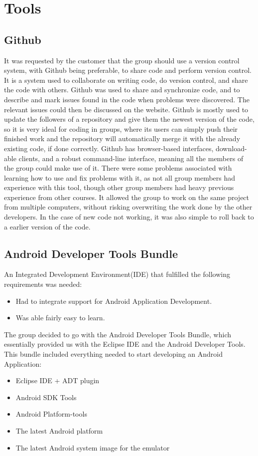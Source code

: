 \chapter{Tools}

\section{Github} 
\label{def:github}
\label{def:githubDev}
It was requested by the customer that the group should use a version control system, with Github being preferable, to share code and perform version control. It is a system used to collaborate on writing code, do version control, and share the code with others.  Github was used to share and synchronize code, and to describe and mark issues found in the code when problems were discovered. The relevant issues could then be discussed on the website.  Github is mostly used to update the followers of a repository and give them the newest version of the code, so it is  very ideal for coding in groups, where its users can simply push their finished work and the repository will automatically merge it with the already existing code, if done correctly.  Github has browser-based interfaces, download-able clients, and a robust command-line interface, meaning all the members of the group could make use of it. There were some problems associated with learning how to use and fix problems with it, as not all group members had experience with this tool, though other group members had heavy previous experience from other courses. It allowed the group to work on the same project from multiple computers, without risking overwriting the work done by the other developers. In the case of new code not working, it was also simple to roll back to a earlier version of the code. 

\section{Android Developer Tools Bundle}
An Integrated Development Environment(IDE) that fulfilled the following requirements was needed:
\begin{itemize}
\item Had to integrate support for Android Application Development.
\item Was able fairly easy to learn. 
\end{itemize}
The group decided to go with the Android Developer Tools Bundle, which essentially provided us with the Eclipse IDE and the Android Developer Tools. This bundle included everything needed to start developing an Android Application:
\begin{itemize}
\item Eclipse IDE + ADT plugin
\item Android SDK Tools
\item Android Platform-tools
\item The latest Android platform
\item The latest Android system image for the emulator
\end{itemize}

